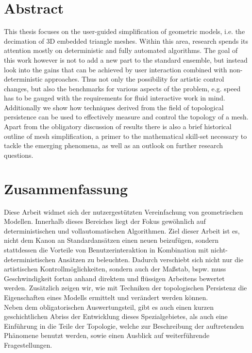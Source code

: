 \section*{Abstract}
\label{abstract}

This thesis focuses on the user-guided simplification of geometric models, i.e. the decimation of 3D embedded triangle meshes.
Within this area, research spends its attention mostly on deterministic and fully automated algorithms.
The goal of this work however is not to add a new part to the standard ensemble, but instead look into the gains that can be achieved by user interaction combined with non-deterministic approaches.
Thus not only the possibility for artistic control changes, but also the benchmarks for various aspects of the problem, e.g. speed has to be gauged with the requirements for fluid interactive work in mind.
Additionally we show how techniques derived from the field of topological persistence can be used to effectively measure and control the topology of a mesh.\\
Apart from the obligatory discussion of results there is also a brief historical outline of mesh simplification, a primer to the mathematical skill-set necessary to tackle the emerging phenomena, as well as an outlook on further research questions.\\[1ex]

\section*{Zusammenfassung}
\label{zusammenfassung}

Diese Arbeit widmet sich der nutzergestützten Vereinfachung von geometrischen Modellen.
Innerhalb dieses Bereiches liegt der Fokus gewöhnlich auf deterministischen und vollautomatischen Algorithmen.
Ziel dieser Arbeit ist es, nicht dem Kanon an Standardansätzen einen neuen beizufügen, sondern stattdessen die Vorteile von Benutzerinteraktion in Kombination mit nicht-deterministischen Ansätzen zu beleuchten. 
Dadurch verschiebt sich nicht nur die artistischen Kontrollmöglichkeiten, sondern auch der Maßstab, bspw. muss Geschwindigkeit fortan anhand direktem und flüssigen Arbeitens bewertet werden.
Zusätzlich zeigen wir, wie mit Techniken der topologischen Persistenz die Eigenschaften eines Modells ermittelt und verändert werden können.\\
Neben dem obligatorischen Auswertungsteil, gibt es auch einen kurzen geschichtlichen Abriss der Entwicklung dieses Spezialgebietes, als auch eine Einführung in die Teile der Topologie, welche zur Beschreibung der auftretenden Phänomene benutzt werden, sowie einen Ausblick auf weiterführende Fragestellungen. 
